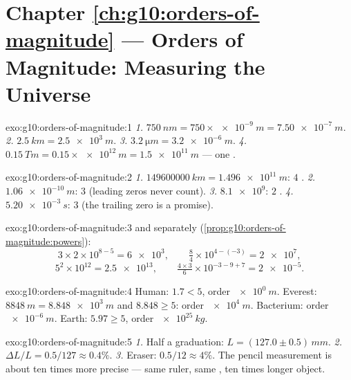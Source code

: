\section*{Chapter \ref{ch:g10:orders-of-magnitude} --- Orders of Magnitude: Measuring the Universe}

\begin{solution}{exo:g10:orders-of-magnitude:1}
\emph{1.} $\qty{750}{nm} = 750 \times \qty{e-9}{m} = \qty{7.50e-7}{m}$.
\emph{2.} $\qty{2.5}{km} = \qty{2.5e3}{m}$.
\emph{3.} $\qty{3.2}{\micro m} = \qty{3.2e-6}{m}$.
\emph{4.} $\qty{0.15}{Tm} = 0.15 \times \qty{e12}{m} = \qty{1.5e11}{m}$
--- one .
\end{solution}

\begin{solution}{exo:g10:orders-of-magnitude:2}
\emph{1.} $\qty{149600000}{km} = \qty{1.496e11}{m}$: $4$ .
\emph{2.} $\qty{1.06e-10}{m}$: $3$  (leading zeros
never count).
\emph{3.} $\num{8.1e9}$: $2$ .
\emph{4.} $\qty{5.20e-3}{s}$: $3$  (the trailing
zero is a promise).
\end{solution}

\begin{solution}{exo:g10:orders-of-magnitude:3}
 and  separately
(\cref{prop:g10:orders-of-magnitude:powers}):
\[
3 \times 2 \times 10^{8-5} = \num{6e3}, \qquad
\tfrac{8}{4} \times 10^{4-(-3)} = \num{2e7},
\]
\[
5^{2} \times 10^{12} = \num{2.5e13}, \qquad
\tfrac{4 \times 3}{6} \times 10^{-3-9+7} = \num{2e-5} .
\]
\end{solution}

\begin{solution}{exo:g10:orders-of-magnitude:4}
Human: $1.7 < 5$, order $\qty{e0}{m}$. Everest:
$\qty{8848}{m} = \qty{8.848e3}{m}$ and $8.848 \geq 5$: order
$\qty{e4}{m}$. Bacterium: order $\qty{e-6}{m}$. Earth:
$5.97 \geq 5$, order $\qty{e25}{kg}$.
\end{solution}

\begin{solution}{exo:g10:orders-of-magnitude:5}
\emph{1.} Half a graduation: $L = (127.0 \pm 0.5)\,\unit{mm}$.
\emph{2.} $\Delta L / L = 0.5/127 \approx 0.4\%$.
\emph{3.} Eraser: $0.5/12 \approx 4\%$. The pencil measurement is
about ten times more precise --- same ruler, same , ten times longer object.
\end{solution}

